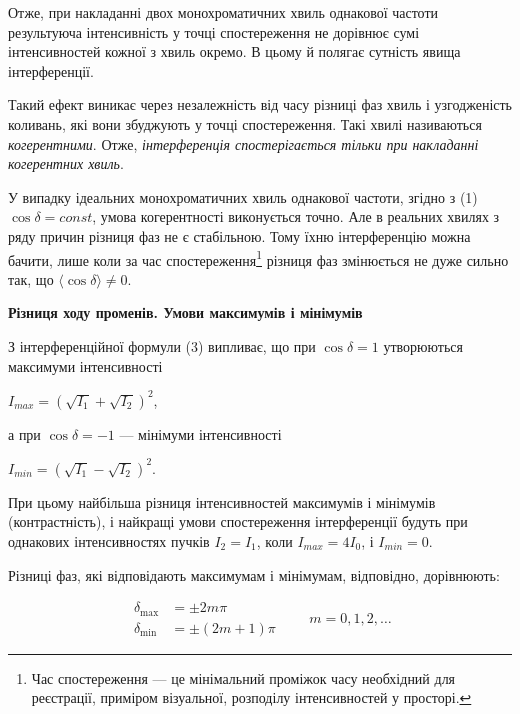 \documentclass[12pt,a4paper]{article}
\begin{document}
    Отже, при накладанні двох монохроматичних хвиль однакової частоти результуюча інтенсивність у точці
    спостереження не дорівнює сумі інтенсивностей кожної з хвиль окремо. В цьому й полягає сутність явища інтерференції.

    Такий ефект виникає через незалежність від часу різниці фаз хвиль і узгодженість коливань, які вони збуджують у точці спостереження.
    Такі хвилі називаються \textit{когерентними}. Отже, \textit{інтерференція спостерігається тільки при накладанні когерентних хвиль}.

    У випадку ідеальних монохроматичних хвиль однакової частоти, згідно з (1) $\cos \delta = const$, умова когерентності виконується точно. Але в реальних
    хвилях з ряду причин різниця фаз не є стабільною. Тому їхню інтерференцію
    можна бачити, лише коли за час спостереження\footnote{Час спостереження --- це мінімальний проміжок часу необхідний для реєстрації, приміром візуальної, розподілу інтенсивностей у просторі.}
    різниця фаз змінюється не дуже сильно так, що $\langle \cos \delta \rangle \neq 0$.

    \begin{center} \textbf{Різниця ходу променів. Умови максимумів і мінімумів} \end{center}

    З інтерференційної формули (3) випливає, що при $\cos \delta = 1$ утворюються максимуми інтенсивності
    
    \begin{center}
        $I_{max} = \left( \sqrt{I_1} + \sqrt{I_2} \right)^2$,
    \end{center}

    а при $\cos \delta = -1$ --- мінімуми інтенсивності

    \begin{center}
        $I_{min} = \left( \sqrt{I_1} - \sqrt{I_2} \right)^2$.
    \end{center}

    При цьому найбільша різниця інтенсивностей максимумів і мінімумів (контрастність), і найкращі умови спостереження інтерференції будуть при однакових інтенсивностях пучків
    $I_2 = I_1$, коли $I_{max} = 4I_0$, і $I_{min} = 0$.

    Різниці фаз, які відповідають максимумам і мінімумам, відповідно, дорівнюють:

    \begin{equation}
        \tag{4}
        \begin{aligned}
        \delta_{\text{max}} &= \pm 2m\pi \\
        \delta_{\text{min}} &= \pm (2m + 1)\pi
        \end{aligned}
        \qquad m = 0, 1, 2, \ldots
    \end{equation}
\end{document}
